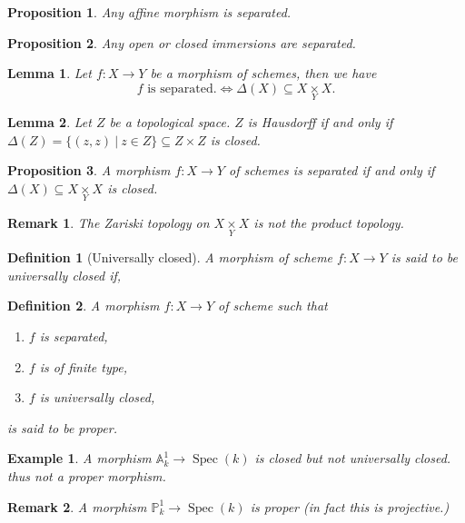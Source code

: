 \documentclass{article}
\newtheorem{proposition}{Proposition}[section]
\newtheorem{definition}{Definition}[section]
\newtheorem{lemma}{Lemma}[section]
\newtheorem{remark}{Remark}[section]
\newtheorem{example}{Example}[section]
\numberwithin{equation}{section}
\DeclareMathOperator{\Spec}{Spec}
\newcommand{\fib}[1]{%
  \mathbin{\mathop{\times}\limits_{#1}}%
}
\begin{document}
\begin{proposition}
Any affine morphism is separated.
\end{proposition}

\begin{proposition}
Any open or closed immersions are separated.
\end{proposition}

\begin{lemma}
Let $f:X\to Y$ be a morphism of schemes, then we have
\begin{equation*}
f\text{ is separated.}\Leftrightarrow \Delta(X)\subseteq X\fib{Y}X.
\end{equation*}
\end{lemma}

\begin{lemma}
Let $Z$ be a topological space. $Z$ is Hausdorff if and only if $\Delta(Z)=\{(z,z)\:|\: z\in Z\}\subseteq Z\times Z$ is closed.
\end{lemma}

\begin{proposition}
A morphism $f:X\to Y$ of schemes is separated if and only if $\Delta(X)\subseteq X\fib{Y}X$ is closed.
\end{proposition}

\begin{remark}
The Zariski topology on $X\fib{Y}X$ is not the product topology.
\end{remark}


\begin{definition}[Universally closed]
A morphism of scheme $f:X\to Y$ is said to be universally closed if,%
\end{definition}

\begin{definition}
A morphism $f:X\to Y$ of scheme such that 
\begin{enumerate}
\item $f$ is separated,
\item $f$ is of finite type,
\item $f$ is universally closed,
\end{enumerate}
is said to be proper.
\end{definition}

\begin{example}
A morphism $\mathbb{A}_k^1\to\Spec(k)$ is closed but not universally closed. thus not a proper morphism.
\end{example}

\begin{remark}
A morphism $\mathbb{P}_k^1\to\Spec(k)$ is proper (in fact this is projective.)
\end{remark}
\end{document}
